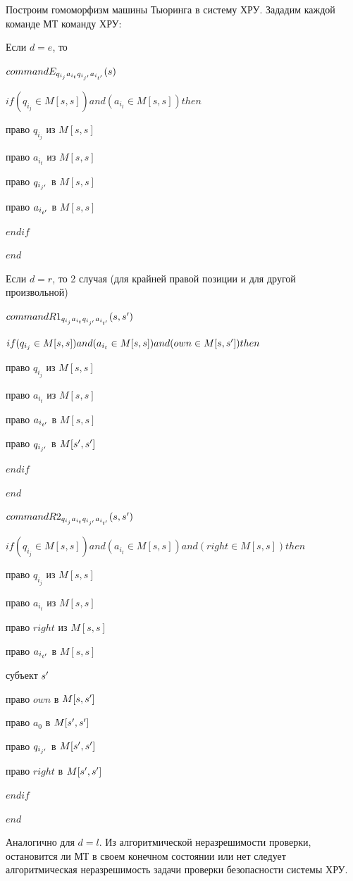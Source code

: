 \begin{proofs}
\begin{dokvo}
		Построим гомоморфизм машины Тьюринга в систему ХРУ. Зададим каждой команде МТ команду ХРУ:

		Если $d = e$, то

		$command E_{q_{i_{j}}a_{i_{t}}q_{i_{j^{\prime}}}a_{i_{t^{\prime}}}}(s)$

		$if (q_{i_{j}} \in M[s,s]) and (a_{i_{t}} \in M[s,s]) then $

		 право $q_{i_{j}}$ из $M[s,s]$

		 право $a_{i_{t}}$ из $M[s,s]$

		 право $q_{i_{j^{\prime}}}$ в $M[s,s]$

		 право $a_{i_{t^{\prime}}}$ в $M[s,s]$

		$endif$

		$end$

		Если $d = r$, то 2 случая (для крайней правой позиции и для другой произвольной)

		$command R1_{q_{i_{j}}a_{i_{t}}q_{i_{j^{\prime}}}a_{i_{t^{\prime}}}}(s, s^{\prime})$

		$if (q_{i_{j}} \in M[s,s]) and (a_{i_{t}} \in M[s,s])and (own \in M[s,s^{\prime}]) then $

		 право $q_{i_{j}}$ из $M[s,s]$

		 право $a_{i_{t}}$ из $M[s,s]$

		 право $a_{i_{t^{\prime}}}$ в $M[s,s]$

		 право $q_{i_{j^{\prime}}}$ в $M[s^{\prime},s^{\prime}]$

		$endif$

		$end$

		$command R2_{q_{i_{j}}a_{i_{t}}q_{i_{j^{\prime}}}a_{i_{t^{\prime}}}}(s, s^{\prime})$

		$if (q_{i_{j}} \in M[s,s]) and (a_{i_{t}} \in M[s,s])and (right \in M[s,s]) then $

		 право $q_{i_{j}}$ из $M[s,s]$

		 право $a_{i_{t}}$ из $M[s,s]$

		 право $right$ из $M[s,s]$

		 право $a_{i_{t^{\prime}}}$ в $M[s,s]$

		 субъект $s^{\prime}$

		 право $own$ в $M[s,s^{\prime}]$

		 право $a_0$ в $M[s^{\prime},s^{\prime}]$

		 право $q_{i_{j^{\prime}}}$ в $M[s^{\prime},s^{\prime}]$

		 право $right$ в $M[s^{\prime},s^{\prime}]$

		$endif$

		$end$

		Аналогично для $d = l$. Из алгоритмической неразрешимости проверки, остановится ли МТ в своем конечном состоянии или нет следует
		алгоритмическая неразрешимость задачи проверки безопасности системы ХРУ.
	\end{dokvo}
\end{proofs}
\newpage
